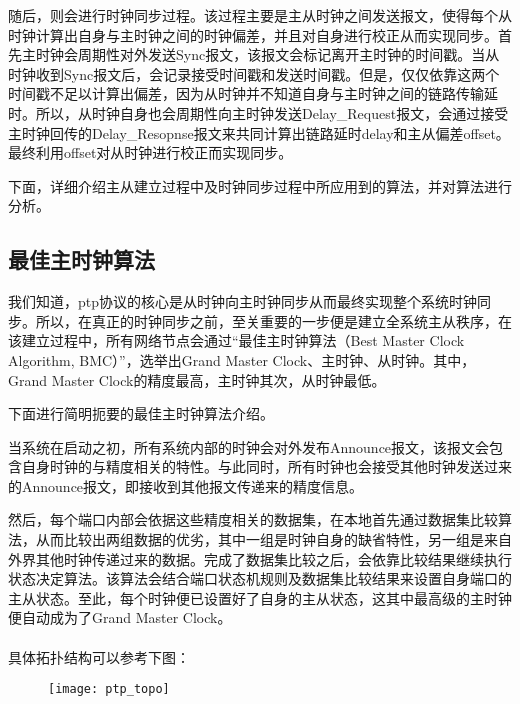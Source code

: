 随后，则会进行时钟同步过程。该过程主要是主从时钟之间发送报文，使得每个从时钟计算出自身与主时钟之间的时钟偏差，并且对自身进行校正从而实现同步。首先主时钟会周期性对外发送Sync报文，该报文会标记离开主时钟的时间戳。当从时钟收到Sync报文后，会记录接受时间戳和发送时间戳。但是，仅仅依靠这两个时间戳不足以计算出偏差，因为从时钟并不知道自身与主时钟之间的链路传输延时。所以，从时钟自身也会周期性向主时钟发送Delay\_Request报文，会通过接受主时钟回传的Delay\_Resopnse报文来共同计算出链路延时delay和主从偏差offset。最终利用offset对从时钟进行校正而实现同步。

下面，详细介绍主从建立过程中及时钟同步过程中所应用到的算法，并对算法进行分析。

\subsection{最佳主时钟算法}
\label{sec:1588_theory_bmc}
我们知道，ptp协议的核心是从时钟向主时钟同步从而最终实现整个系统时钟同步。所以，在真正的时钟同步之前，至关重要的一步便是建立全系统主从秩序，在该建立过程中，所有网络节点会通过“最佳主时钟算法（Best Master Clock Algorithm, BMC）”，选举出Grand Master Clock、主时钟、从时钟。其中，Grand Master Clock的精度最高，主时钟其次，从时钟最低。

下面进行简明扼要的最佳主时钟算法介绍。

当系统在启动之初，所有系统内部的时钟会对外发布Announce报文，该报文会包含自身时钟的与精度相关的特性。与此同时，所有时钟也会接受其他时钟发送过来的Announce报文，即接收到其他报文传递来的精度信息。

然后，每个端口内部会依据这些精度相关的数据集，在本地首先通过数据集比较算法，从而比较出两组数据的优劣，其中一组是时钟自身的缺省特性，另一组是来自外界其他时钟传递过来的数据。完成了数据集比较之后，会依靠比较结果继续执行状态决定算法。该算法会结合端口状态机规则及数据集比较结果来设置自身端口的主从状态。至此，每个时钟便已设置好了自身的主从状态，这其中最高级的主时钟便自动成为了Grand Master Clock。
\\
\\

具体拓扑结构可以参考下图：
\begin{figure}[!hbp]
  \centering
  \begin{minipage}[b]{0.6\textwidth}
    \captionstyle{\centering}
    \centering
    \texttt{[image: ptp\_topo]}
  \end{minipage}     
\end{figure}

